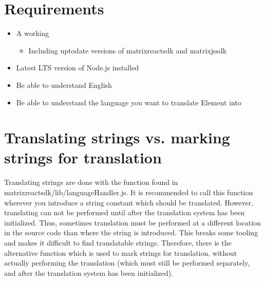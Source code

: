 \documentclass[letterpaper,10pt,openany,oneside,english]{sphinxmanual}
\begin{document}
\chapter{Requirements}
\label{\detokenize{translating-dev:requirements}}\begin{itemize}
\item {} 
\sphinxAtStartPar
A working 
\begin{itemize}
\item {} 
\sphinxAtStartPar
Including up\sphinxhyphen{}to\sphinxhyphen{}date versions of matrix\sphinxhyphen{}react\sphinxhyphen{}sdk and matrix\sphinxhyphen{}js\sphinxhyphen{}sdk

\end{itemize}

\item {} 
\sphinxAtStartPar
Latest LTS version of Node.js installed

\item {} 
\sphinxAtStartPar
Be able to understand English

\item {} 
\sphinxAtStartPar
Be able to understand the language you want to translate Element into

\end{itemize}


\chapter{Translating strings vs. marking strings for translation}
\label{\detokenize{translating-dev:translating-strings-vs-marking-strings-for-translation}}
\sphinxAtStartPar
Translating strings are done with the  function found in matrix\sphinxhyphen{}react\sphinxhyphen{}sdk/lib/languageHandler.js. It is recommended to call this function wherever you introduce a string constant which should be translated. However, translating can not be performed until after the translation system has been initialized. Thus, sometimes translation must be performed at a different location in the source code than where the string is introduced. This breaks some tooling and makes it difficult to find translatable strings. Therefore, there is the alternative  function which is used to mark strings for translation, without actually performing the translation (which must still be performed separately, and after the translation system has been initialized).
\end{document}
